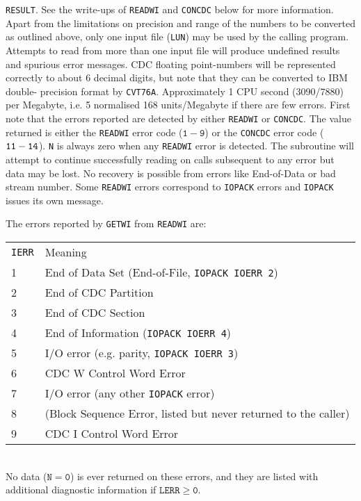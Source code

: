 {\tt RESULT}. See the write-ups of {\tt READWI} and {\tt CONCDC} below
for more information.
\Restrict
Apart from the limitations on precision and range of the
numbers to be converted as outlined above, only one input file
({\tt LUN}) may be used by the calling program. Attempts to read from
more than one input file will produce undefined results and spurious
error messages.
\Accuracy
CDC floating point-numbers will be represented correctly to about 6
decimal digits, but note that they can be converted to IBM double-
precision format by {\tt CVT76A}.
\Timing
Approximately 1 CPU second (3090/7880) per Megabyte, i.e. 5
normalised 168 units/Megabyte if there are few errors.
\Errorh
First note that the errors reported are detected by either {\tt READWI}
or {\tt CONCDC}. The value returned is either the {\tt READWI} error
code ($\mathtt{1-9}$) or the {\tt CONCDC} error code (${\tt 11-14}$).
{\tt N} is always zero when any {\tt READWI} error is detected.
The subroutine will attempt to continue successfully reading on calls
subsequent to any error but data may be lost. No recovery is possible
from errors like End-of-Data or bad stream number. Some {\tt READWI}
errors correspond to {\tt IOPACK} errors and {\tt IOPACK} issues its
own message.
\par
The errors reported by {\tt GETWI} from {\tt READWI} are: \\[2mm]
\begin{tabular}{@{\hspace*{10mm}}l@{\qquad}l}
{\tt IERR} & Meaning \\[2mm]
1 & End of Data Set (End-of-File, {\tt IOPACK IOERR 2}) \\
2 & End of CDC Partition \\
3 & End of CDC Section  \\
4 & End of Information ({\tt IOPACK IOERR 4}) \\
5 & I/O error (e.g. parity, {\tt IOPACK IOERR 3}) \\
6 & CDC W Control Word Error \\
7 & I/O error (any other {\tt IOPACK} error) \\
8 & (Block Sequence Error, listed but never returned to the caller) \\
9 & CDC I Control Word Error
\end{tabular} \\[2mm]
No data ($\mathtt{N=0}$) is ever returned on these errors, and they are
listed with additional diagnostic information if $\mathtt{LERR \geq 0}$.
\par
